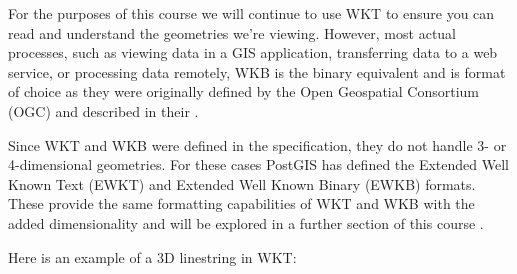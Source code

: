 \documentclass[a4paper,11pt,english]{sphinxmanual}
\begin{document}
\begin{sphinxVerbatim}[commandchars=\\\{\}]
 
\end{sphinxVerbatim}

\begin{sphinxVerbatim}[commandchars=\\\{\}]
\end{sphinxVerbatim}

For the purposes of this course we will continue to use WKT to ensure you can read and understand the geometries we’re viewing.  However, most actual processes, such as viewing data in a GIS application, transferring data to a web service, or processing data remotely, WKB is the binary equivalent and is format of choice as they were originally defined by the Open Geospatial Consortium (OGC) and described in their .

Since WKT and WKB were defined in the  {\hyperref[\detokenize{glossary:term-sfsql}]{}} specification, they do not handle 3- or 4-dimensional geometries.  For these cases PostGIS has defined the Extended Well Known Text (EWKT) and Extended Well Known Binary (EWKB) formats.  These provide the same formatting capabilities of WKT and WKB with the added dimensionality and will be explored in a further section of this course {\hyperref[\detokenize{advanced:d}]{}}.

Here is an example of a 3D linestring in WKT:

\begin{sphinxVerbatim}[commandchars=\\\{\}]
 
\end{sphinxVerbatim}

\begin{sphinxVerbatim}[commandchars=\\\{\}]
        
\end{sphinxVerbatim}
\end{document}
